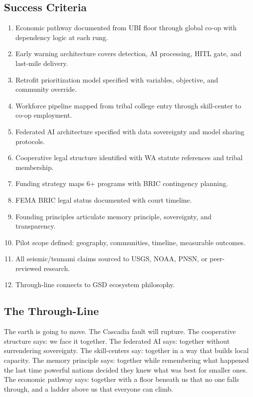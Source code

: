 \documentclass[11pt,letterpaper]{article}
\begin{document}
\subsection{Success Criteria}

\begin{enumerate}[leftmargin=2.5em]
  \item Economic pathway documented from UBI floor through global co-op with dependency logic at each rung.
  \item Early warning architecture covers detection, AI processing, HITL gate, and last-mile delivery.
  \item Retrofit prioritization model specified with variables, objective, and community override.
  \item Workforce pipeline mapped from tribal college entry through skill-center to co-op employment.
  \item Federated AI architecture specified with data sovereignty and model sharing protocols.
  \item Cooperative legal structure identified with WA statute references and tribal membership.
  \item Funding strategy maps 6+ programs with BRIC contingency planning.
  \item FEMA BRIC legal status documented with court timeline.
  \item Founding principles articulate memory principle, sovereignty, and transparency.
  \item Pilot scope defined: geography, communities, timeline, measurable outcomes.
  \item All seismic/tsunami claims sourced to USGS, NOAA, PNSN, or peer-reviewed research.
  \item Through-line connects to GSD ecosystem philosophy.
\end{enumerate}

\subsection{The Through-Line}

The earth is going to move. The Cascadia fault will rupture. The cooperative structure says: we face it together. The federated AI says: together without surrendering sovereignty. The skill-centers say: together in a way that builds local capacity. The memory principle says: together while remembering what happened the last time powerful nations decided they knew what was best for smaller ones. The economic pathway says: together with a floor beneath us that no one falls through, and a ladder above us that everyone can climb.
\end{document}
